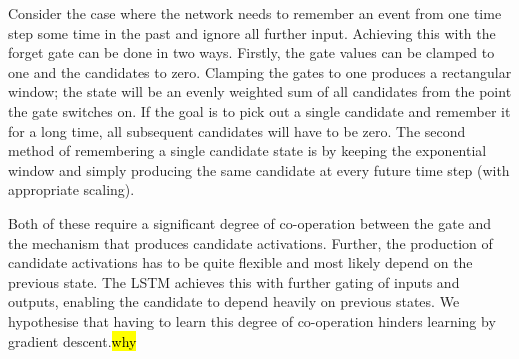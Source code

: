 Consider the case where the network needs to remember an event from one time step some time in the
past and ignore all further input. Achieving this with the forget gate can be done in two
ways. Firstly, the gate values can be clamped to one and the
candidates to zero. Clamping the gates to one produces a rectangular window; the state will be an
evenly weighted sum of all candidates from the point the gate switches on. If the goal is to pick
out a single candidate and remember it for a long time, all subsequent
candidates will have to be zero. 
The second method of remembering a single candidate state is by keeping the exponential window 
and simply producing the same candidate at every future time step (with
appropriate scaling).

Both of these require a significant degree of co-operation between the gate and the mechanism that
produces candidate activations. Further, the production of candidate activations has to be quite
flexible and most likely depend on the previous state. The LSTM achieves this with further gating
of inputs and outputs, enabling the candidate to depend heavily on previous states. We hypothesise that
having to learn this degree of co-operation hinders learning by gradient descent.\hl{why}


